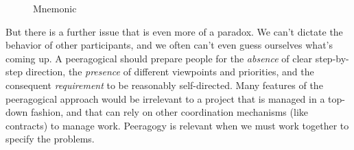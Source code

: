 \begin{wrapfigure}{l}{.52\textwidth}
\vspace{-2.8cm}
\hspace{-.15cm}\resizebox{.55\textwidth}{!}{

}
\hspace{.4cm}
\vspace{-2.95cm}
\caption{Mnemonic \label{mnemonic}}
\vspace{-.6cm}
\end{wrapfigure}

But there is a further issue that is even more of a paradox.  We can't
dictate the behavior of other participants, and we often can't even
guess ourselves what's coming up.  A peeragogical
 should prepare people for the \emph{absence} of
clear step-by-step direction, the \emph{presence} of different
viewpoints and priorities, and the consequent \emph{requirement} to be
reasonably self-directed.  Many features of the peeragogical approach
would be irrelevant to a project that is managed in a top-down fashion,
and that can rely on other coordination mechanisms (like contracts) to
manage work.  Peeragogy is relevant when we must work together to specify the problems.


